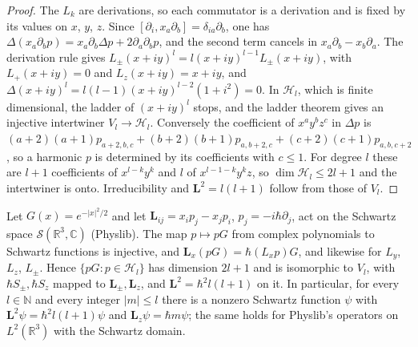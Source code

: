 \begin{proof}\leanok
  The $L_k$ are derivations, so each commutator is a derivation and is fixed by its values on $x$, $y$, $z$. Since
  $[\partial_i,x_a\partial_b]=\delta_{ia}\partial_b$, one has $\Delta(x_a\partial_bp)=x_a\partial_b\Delta p+2\partial_a\partial_bp$, and the
  second term cancels in $x_a\partial_b-x_b\partial_a$. The derivation rule gives $L_\pm(x+iy)^l=l(x+iy)^{l-1}L_\pm(x+iy)$, with
  $L_+(x+iy)=0$ and $L_z(x+iy)=x+iy$, and $\Delta(x+iy)^l=l(l-1)(x+iy)^{l-2}(1+i^2)=0$. In $\mathcal H_l$, which is finite
  dimensional, the ladder of $(x+iy)^l$ stops, and the ladder theorem gives an injective intertwiner $V_l\to\mathcal H_l$.
  Conversely the coefficient of $x^ay^bz^c$ in $\Delta p$ is $(a+2)(a+1)p_{a+2,b,c}+(b+2)(b+1)p_{a,b+2,c}+(c+2)(c+1)p_{a,b,c+2}$,
  so a harmonic $p$ is determined by its coefficients with $c\le1$. For degree $l$ these are $l+1$ coefficients of
  $x^{l-k}y^k$ and $l$ of $x^{l-1-k}y^kz$, so $\dim\mathcal H_l\le2l+1$ and the intertwiner is onto. Irreducibility and
  $\mathbf L^2=l(l+1)$ follow from those of $V_l$.
\end{proof}

\begin{theorem}\label{thm:orbital-L-schwartz}
  \leanok
  Let $G(x)=e^{-|x|^2/2}$ and let $\mathbf L_{ij}=x_ip_j-x_jp_i$, $p_j=-i\hbar\partial_j$, act on the Schwartz space
  $\mathcal S(\mathbb R^3,\mathbb C)$ (Physlib). The map $p\mapsto pG$ from complex polynomials to Schwartz functions is
  injective, and $\mathbf L_x(pG)=\hbar(L_xp)G$, and likewise for $L_y$, $L_z$, $L_\pm$. Hence
  $\{pG:p\in\mathcal H_l\}$ has dimension $2l+1$ and is isomorphic to $V_l$, with $\hbar S_\pm,\hbar S_z$ mapped to
  $\mathbf L_\pm,\mathbf L_z$, and $\mathbf L^2=\hbar^2l(l+1)$ on it. In particular, for every $l\in\mathbb N$ and every integer
  $|m|\le l$ there is a nonzero Schwartz function $\psi$ with $\mathbf L^2\psi=\hbar^2l(l+1)\psi$ and
  $\mathbf L_z\psi=\hbar m\psi$; the same holds for Physlib's operators on $L^2(\mathbb R^3)$ with the Schwartz domain.
\end{theorem}

